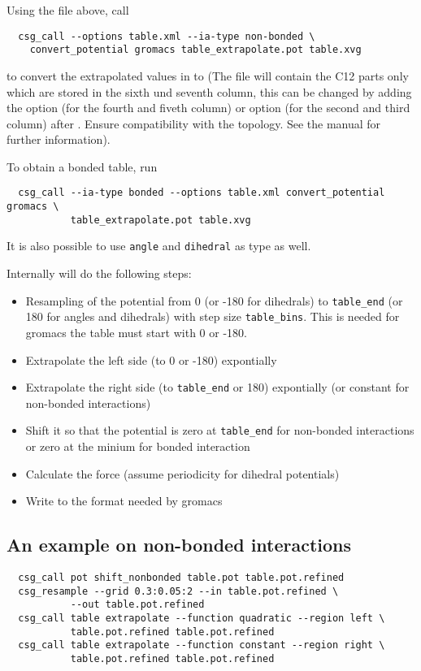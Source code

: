 Using the  file above, call
\begin{verbatim}
  csg_call --options table.xml --ia-type non-bonded \
    convert_potential gromacs table_extrapolate.pot table.xvg
\end{verbatim}
to convert the extrapolated values in  to  (The file will contain the \gromacs C12 parts only which are stored in the sixth und seventh column, this can be changed by adding the  option (for the fourth and fiveth column) or  option (for the second and third column) after . Ensure compatibility with the \gromacs topology. See the \gromacs manual for further information).

To obtain a bonded table, run
\begin{verbatim}
  csg_call --ia-type bonded --options table.xml convert_potential gromacs \
           table_extrapolate.pot table.xvg
\end{verbatim}
It is also possible to use \texttt{angle} and \texttt{dihedral} as type as well.

Internally \progopt{convert_potential gromacs} will do the following steps:
\begin{itemize}
\item Resampling of the potential from 0 (or -180 for dihedrals) to \texttt{table\_end} (or 180 for angles and dihedrals) with step size \texttt{table\_bins}. This is needed for gromacs the table must start with 0 or -180.
\item Extrapolate the left side (to 0 or -180) expontially
\item Extrapolate the right side (to \texttt{table\_end} or 180) expontially (or constant for non-bonded interactions)
\item Shift it so that the potential is zero at \texttt{table\_end} for non-bonded interactions or zero at the minium for bonded interaction
\item Calculate the force (assume periodicity for dihedral potentials)
\item Write to the format needed by gromacs
\end{itemize}

\subsection*{An example on non-bonded interactions}
\begin{verbatim}
  csg_call pot shift_nonbonded table.pot table.pot.refined
  csg_resample --grid 0.3:0.05:2 --in table.pot.refined \
           --out table.pot.refined
  csg_call table extrapolate --function quadratic --region left \
           table.pot.refined table.pot.refined
  csg_call table extrapolate --function constant --region right \
           table.pot.refined table.pot.refined
\end{verbatim}

